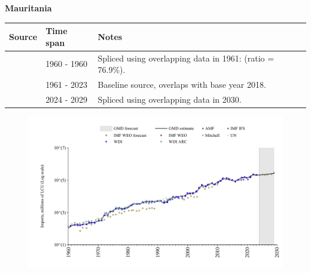 \documentclass[12pt,a4paper,landscape]{article}
\begin{document}
\begin{adjustbox}{max totalsize={\paperwidth}{\paperheight},center}
\begin{minipage}[t][\textheight][t]{\textwidth}
\vspace*{0.5cm}
{}
\begin{center}
{\Large\bfseries Mauritania}
\end{center}
\vspace{0.5cm}
\begin{table}[H]
\centering
\small
\begin{tabular}{|l|l|l|}
\hline
\textbf{Source} & \textbf{Time span} & \textbf{Notes} \\
\hline
\rowcolor{white}\cite{WDI_ARC}& 1960 - 1960 &Spliced using overlapping data in 1961: (ratio = 76.9\%).\\
\rowcolor{lightgray}\cite{WDI}& 1961 - 2023 &Baseline source, overlaps with base year 2018.\\
\rowcolor{white}\cite{IMF_WEO_forecast}& 2024 - 2029 &Spliced using overlapping data in 2030.\\
\hline
\end{tabular}
\end{table}
\begin{figure}[H]
\centering
\includegraphics[width=\textwidth,height=0.6\textheight,keepaspectratio]{graphs/MRT_imports.pdf}
\end{figure}
\end{minipage}
\end{adjustbox}
\end{document}
